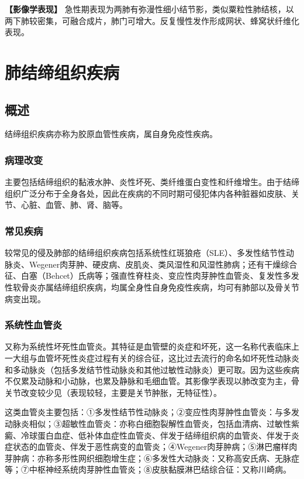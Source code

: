 \textbf{【影像学表现】}
急性期表现为两肺有弥漫性细小结节影，类似粟粒性肺结核，以两下肺较密集，可融合成片，肺门可增大。反复慢性发作形成网状、蜂窝状纤维化表现。

\section{肺结缔组织疾病}

\subsection{概述}

结缔组织疾病亦称为胶原血管性疾病，属自身免疫性疾病。

\subsubsection{病理改变}

主要包括结缔组织的黏液水肿、炎性坏死、类纤维蛋白变性和纤维增生。由于结缔组织广泛分布于全身各处，因此在疾病的不同时期可侵犯体内各种脏器如皮肤、关节、心脏、血管、肺、肾、脑等。

\subsubsection{常见疾病}

较常见的侵及肺部的结缔组织疾病包括系统性红斑狼疮（SLE）、多发性结节性动脉炎、Wegener肉芽肿、硬皮病、皮肌炎、类风湿性和风湿性肺病；还有干燥综合征、白塞（Behcet）氏病等；强直性脊柱炎、变应性肉芽肿性血管炎、复发性多发性软骨炎亦属结缔组织疾病，均属全身性自身免疫性疾病，均可有肺部以及骨关节病变出现。

\subsubsection{系统性血管炎}

又称为系统性坏死性血管炎。其特征是血管壁的炎症和坏死，这一名称代表临床上一大组与血管坏死性炎症过程有关的综合征，这比过去流行的命名如坏死性动脉炎和多动脉炎（包括多发结节性动脉炎和其他过敏性动脉炎）更可取。因为这些疾病不仅累及动脉和小动脉，也累及静脉和毛细血管。其影像学表现以肺改变为主，骨关节改变较少见（表现较轻，主要是关节肿胀，无特征性）。

这类血管炎主要包括：①多发性结节性动脉炎；②变应性肉芽肿性血管炎：与多发动脉炎相似；③超敏性血管炎：亦称白细胞裂解性血管炎，包括血清病、过敏性紫癜、冷球蛋白血症、低补体血症性血管炎、伴发于结缔组织病的血管炎、伴发于炎症状态的血管炎、伴发于恶性病变的血管炎；④Wegener肉芽肿病；⑤淋巴瘤样肉芽肿病：亦称多形性网织细胞增生症；⑥多发性大动脉炎：又称高安氏病、无脉症等；⑦中枢神经系统肉芽肿性血管炎；⑧皮肤黏膜淋巴结综合征：又称川崎病。

